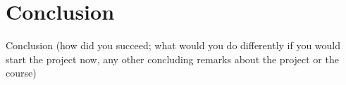 \chapter{Conclusion}
Conclusion (how did you succeed; what would you do differently if you would start the project now, any other concluding remarks about the project or the course)